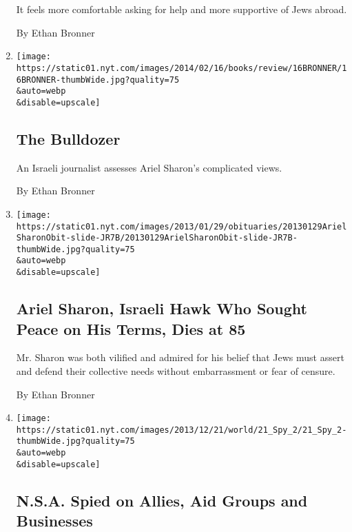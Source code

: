 \begin{enumerate}
  It feels more comfortable asking for help and more supportive of Jews
  abroad.

  By Ethan Bronner
\item
  \href{/2014/02/16/books/review/arik-the-life-of-ariel-sharon-by-david-landau.html}{}

  \texttt{[image: https://static01.nyt.com/images/2014/02/16/books/review/16BRONNER/16BRONNER-thumbWide.jpg?quality=75\\\&auto=webp\\\&disable=upscale]}

  \hypertarget{the-bulldozer}{%
  \subsection{The Bulldozer}\label{the-bulldozer}}

  An Israeli journalist assesses Ariel Sharon's complicated views.

  By Ethan Bronner
\item
  \href{/2014/01/12/world/middleeast/ariel-sharon-fierce-defender-of-a-strong-israel-dies-at-85.html}{}

  \texttt{[image: https://static01.nyt.com/images/2013/01/29/obituaries/20130129ArielSharonObit-slide-JR7B/20130129ArielSharonObit-slide-JR7B-thumbWide.jpg?quality=75\\\&auto=webp\\\&disable=upscale]}

  \hypertarget{ariel-sharon-israeli-hawk-who-sought-peace-on-his-terms-dies-at-85}{%
  \subsection{Ariel Sharon, Israeli Hawk Who Sought Peace on His Terms,
  Dies at
  85}\label{ariel-sharon-israeli-hawk-who-sought-peace-on-his-terms-dies-at-85}}

  Mr. Sharon was both vilified and admired for his belief that Jews must
  assert and defend their collective needs without embarrassment or fear
  of censure.

  By Ethan Bronner
\item
  \href{/2013/12/21/world/nsa-dragnet-included-allies-aid-groups-and-business-elite.html}{}

  \texttt{[image: https://static01.nyt.com/images/2013/12/21/world/21\_Spy\_2/21\_Spy\_2-thumbWide.jpg?quality=75\\\&auto=webp\\\&disable=upscale]}

  \hypertarget{nsa-spied-on-allies-aid-groups-and-businesses}{%
  \subsection{N.S.A. Spied on Allies, Aid Groups and
  Businesses}\label{nsa-spied-on-allies-aid-groups-and-businesses}}


\end{enumerate}
